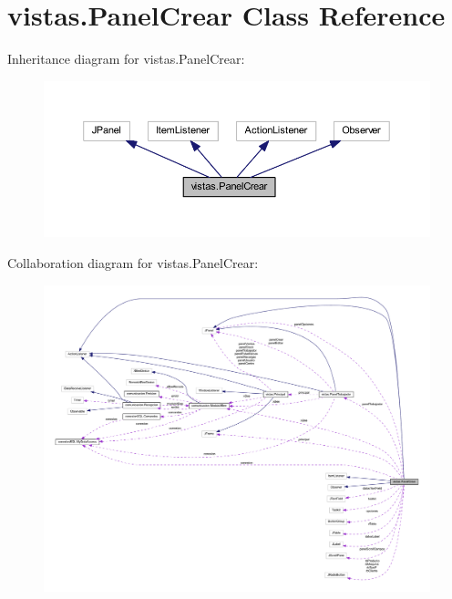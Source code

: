 \hypertarget{classvistas_1_1_panel_crear}{}\section{vistas.\+Panel\+Crear Class Reference}
\label{classvistas_1_1_panel_crear}


Inheritance diagram for vistas.\+Panel\+Crear\+:
\nopagebreak
\begin{figure}[H]
\begin{center}
\leavevmode
\includegraphics[width=350pt]{classvistas_1_1_panel_crear__inherit__graph}
\end{center}
\end{figure}


Collaboration diagram for vistas.\+Panel\+Crear\+:
\nopagebreak
\begin{figure}[H]
\begin{center}
\leavevmode
\includegraphics[width=350pt]{classvistas_1_1_panel_crear__coll__graph}
\end{center}
\end{figure}
